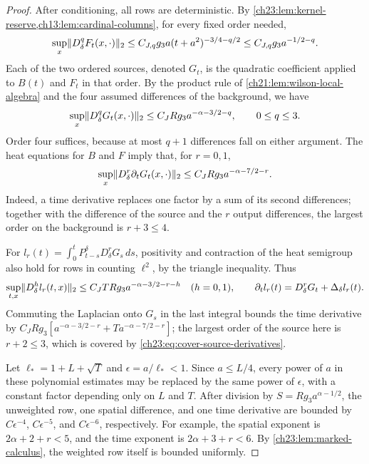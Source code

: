 \begin{proof}
After conditioning, all rows are deterministic. By \cref{ch23:lem:kernel-reserve,ch13:lem:cardinal-columns}, for every fixed order needed,
\[
 \sup_x\lVert D_\delta^qF_t(x,\cdot)\rVert_2\le C_{J,q}g_3a(t+a^2)^{-3/4-q/2}\le C_{J,q}g_3a^{-1/2-q}.
\]
Each of the two ordered sources, denoted $G_t$, is the quadratic coefficient applied to $B(t)$ and $F_t$ in that order. By the product rule of \cref{ch21:lem:wilson-local-algebra} and the four assumed differences of the background, we have
\begin{equation}\label{ch23:eq:cover-source-derivatives}
 \sup_x\lVert D_\delta^qG_t(x,\cdot)\rVert_2\le C_JRg_3a^{-\alpha-3/2-q},\qquad 0\le q\le3.
\end{equation}
Order four suffices, because at most $q+1$ differences fall on either argument. The heat equations for $B$ and $F$ imply that, for $r=0,1$,
\[
 \sup_x\lVert D_\delta^r\partial_tG_t(x,\cdot)\rVert_2\le C_JRg_3a^{-\alpha-7/2-r}.
\]
Indeed, a time derivative replaces one factor by a sum of its second differences; together with the difference of the source and the $r$ output differences, the largest order on the background is $r+3\le4$.

For $l_r(t)=\int_0^tP_{t-s}^\delta D_\delta^rG_s\,ds$, positivity and contraction of the heat semigroup also hold for rows in counting $\ell^2$, by the triangle inequality. Thus
\[
 \sup_{t,x}\lVert D_\delta^hl_r(t,x)\rVert_2\le C_JTRg_3a^{-\alpha-3/2-r-h}\quad(h=0,1),\qquad
 \partial_tl_r(t)=D_\delta^rG_t+\Delta_\delta l_r(t).
\]
Commuting the Laplacian onto $G_s$ in the last integral bounds the time derivative by $C_JRg_3[a^{-\alpha-3/2-r}+Ta^{-\alpha-7/2-r}]$; the largest order of the source here is $r+2\le3$, which is covered by \eqref{ch23:eq:cover-source-derivatives}.

Let $\ell_*=1+L+\sqrt T$ and $\epsilon=a/\ell_*<1$. Since $a\le L/4$, every power of $a$ in these polynomial estimates may be replaced by the same power of $\epsilon$, with a constant factor depending only on $L$ and $T$. After division by $S=Rg_3a^{\alpha-1/2}$, the unweighted row, one spatial difference, and one time derivative are bounded by $C\epsilon^{-4}$, $C\epsilon^{-5}$, and $C\epsilon^{-6}$, respectively. For example, the spatial exponent is $2\alpha+2+r<5$, and the time exponent is $2\alpha+3+r<6$. By \cref{ch23:lem:marked-calculus}, the weighted row itself is bounded uniformly.


\end{proof}
